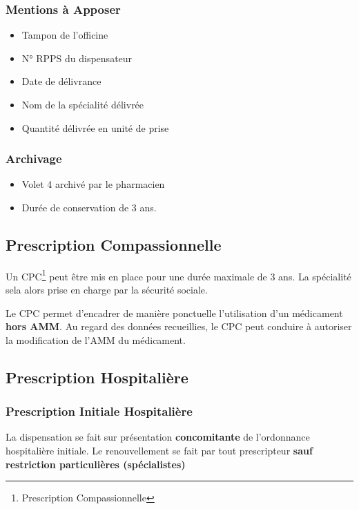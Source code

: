 \documentclass[11pt]{article}
\begin{document}
\subsubsection{Mentions à Apposer}
\label{sec:orgdac8f94}
\begin{itemize}
\item Tampon de l'officine
\item N° RPPS du dispensateur
\item Date de délivrance
\item Nom de la spécialité délivrée
\item Quantité délivrée en unité de prise
\end{itemize}


\subsubsection{Archivage}
\label{sec:org821feb5}
\begin{itemize}
\item Volet 4 archivé par le pharmacien
\item Durée de conservation de 3 ans.
\end{itemize}

\subsection{Prescription Compassionnelle}
\label{sec:org694a8cb}
Un CPC\footnote{Prescription Compassionnelle} peut être mis en place pour une durée maximale de 3 ans.
La spécialité sela alors prise en charge par la sécurité sociale.

Le CPC permet d'encadrer de manière ponctuelle l'utilisation d'un médicament \textbf{hors AMM}.
Au regard des données recueillies, le CPC peut conduire à autoriser la modification de l'AMM du médicament.

\subsection{Prescription Hospitalière}
\label{sec:org2545de9}

\subsubsection{Prescription Initiale Hospitalière}
\label{sec:orga2bb01a}
La dispensation se fait sur présentation \textbf{concomitante} de l'ordonnance hospitalière initiale.
Le renouvellement se fait par tout prescripteur \textbf{sauf restriction particulières (spécialistes)}
\end{document}
